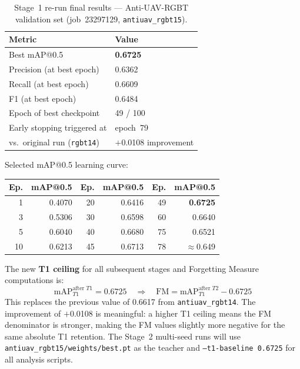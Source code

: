 \begin{table}[h]
\centering
\caption{Stage~1 re-run final results — Anti-UAV-RGBT validation set
(job~23297129, \texttt{antiuav\_rgbt15}).}
\label{tab:s1_rerun_results}
\begin{tabular}{ll}
\hline
\textbf{Metric}                     & \textbf{Value} \\
\hline
Best mAP@0.5                        & \textbf{0.6725} \\
Precision (at best epoch)           & 0.6362 \\
Recall (at best epoch)              & 0.6609 \\
F1 (at best epoch)                  & 0.6484 \\
Epoch of best checkpoint            & 49 / 100 \\
Early stopping triggered at         & epoch~79 \\
vs.\ original run (\texttt{rgbt14}) & $+$0.0108 improvement \\
\hline
\end{tabular}
\end{table}

\noindent Selected mAP@0.5 learning curve:

\begin{center}
\small
\begin{tabular}{rr|rr|rr}
\hline
\textbf{Ep.} & \textbf{mAP@0.5} &
\textbf{Ep.} & \textbf{mAP@0.5} &
\textbf{Ep.} & \textbf{mAP@0.5} \\
\hline
 1 & 0.4070 &  20 & 0.6416 &  49 & \textbf{0.6725} \\
 3 & 0.5306 &  30 & 0.6598 &  60 & 0.6640 \\
 5 & 0.6040 &  40 & 0.6680 &  75 & 0.6521 \\
10 & 0.6213 &  45 & 0.6713 &  78 & $\approx$0.649 \\
\hline
\end{tabular}
\end{center}

\noindent The new \textbf{T1 ceiling} for all subsequent stages and
Forgetting Measure computations is:
\[
    \text{mAP}_{T1}^{\text{after }T1} = \mathbf{0.6725}
    \quad \Rightarrow \quad
    \text{FM} = \text{mAP}_{T1}^{\text{after }T2} - 0.6725
\]
This replaces the previous value of 0.6617 from \texttt{antiuav\_rgbt14}.
The improvement of $+$0.0108 is meaningful: a higher T1 ceiling means
the FM denominator is stronger, making the FM values slightly more
negative for the same absolute T1 retention. The Stage~2 multi-seed
runs will use \texttt{antiuav\_rgbt15/weights/best.pt} as the teacher
and \texttt{--t1-baseline 0.6725} for all analysis scripts.

